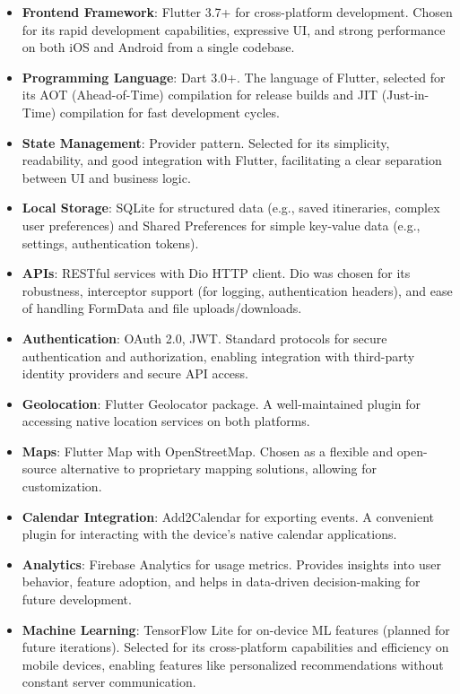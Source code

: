 \documentclass[11pt, a4paper]{article}
\begin{document}
\begin{itemize}
    \item \textbf{Frontend Framework}: Flutter 3.7+ for cross-platform development. Chosen for its rapid development capabilities, expressive UI, and strong performance on both iOS and Android from a single codebase.
    \item \textbf{Programming Language}: Dart 3.0+. The language of Flutter, selected for its AOT (Ahead-of-Time) compilation for release builds and JIT (Just-in-Time) compilation for fast development cycles.
    \item \textbf{State Management}: Provider pattern. Selected for its simplicity, readability, and good integration with Flutter, facilitating a clear separation between UI and business logic.
    \item \textbf{Local Storage}: SQLite for structured data (e.g., saved itineraries, complex user preferences) and Shared Preferences for simple key-value data (e.g., settings, authentication tokens).
    \item \textbf{APIs}: RESTful services with Dio HTTP client. Dio was chosen for its robustness, interceptor support (for logging, authentication headers), and ease of handling FormData and file uploads/downloads.
    \item \textbf{Authentication}: OAuth 2.0, JWT. Standard protocols for secure authentication and authorization, enabling integration with third-party identity providers and secure API access.
    \item \textbf{Geolocation}: Flutter Geolocator package. A well-maintained plugin for accessing native location services on both platforms.
    \item \textbf{Maps}: Flutter Map with OpenStreetMap. Chosen as a flexible and open-source alternative to proprietary mapping solutions, allowing for customization.
    \item \textbf{Calendar Integration}: Add2Calendar for exporting events. A convenient plugin for interacting with the device's native calendar applications.
    \item \textbf{Analytics}: Firebase Analytics for usage metrics. Provides insights into user behavior, feature adoption, and helps in data-driven decision-making for future development.
    \item \textbf{Machine Learning}: TensorFlow Lite for on-device ML features (planned for future iterations). Selected for its cross-platform capabilities and efficiency on mobile devices, enabling features like personalized recommendations without constant server communication.
\end{itemize}
\end{document}
